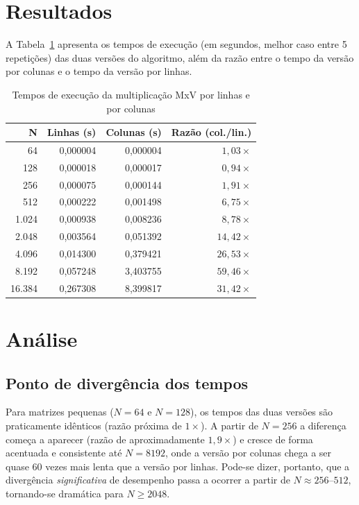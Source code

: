 \documentclass[a4paper,12pt]{article}
\begin{document}
\section{Resultados}

A Tabela~\ref{tab:resultados} apresenta os tempos de execução (em segundos,
melhor caso entre 5 repetições) das duas versões do algoritmo, além da razão
entre o tempo da versão por colunas e o tempo da versão por linhas.

\begin{table}[h]
\centering
\caption{Tempos de execução da multiplicação MxV por linhas e por colunas}
\label{tab:resultados}
\begin{tabular}{rrrr}
\toprule
N & Linhas (s) & Colunas (s) & Razão (col./lin.) \\
\midrule
64      & 0,000004 & 0,000004 & $1{,}03\times$  \\
128     & 0,000018 & 0,000017 & $0{,}94\times$  \\
256     & 0,000075 & 0,000144 & $1{,}91\times$  \\
512     & 0,000222 & 0,001498 & $6{,}75\times$  \\
1.024   & 0,000938 & 0,008236 & $8{,}78\times$  \\
2.048   & 0,003564 & 0,051392 & $14{,}42\times$ \\
4.096   & 0,014300 & 0,379421 & $26{,}53\times$ \\
8.192   & 0,057248 & 3,403755 & $59{,}46\times$ \\
16.384  & 0,267308 & 8,399817 & $31{,}42\times$ \\
\bottomrule
\end{tabular}
\end{table}

\section{Análise}

\subsection{Ponto de divergência dos tempos}

Para matrizes pequenas ($N = 64$ e $N = 128$), os tempos das duas versões são
praticamente idênticos (razão próxima de $1\times$). A partir de $N = 256$ a
diferença começa a aparecer (razão de aproximadamente $1{,}9\times$) e cresce de
forma acentuada e consistente até $N = 8192$, onde a versão por colunas chega a
ser quase 60 vezes mais lenta que a versão por linhas. Pode-se dizer, portanto,
que a divergência \emph{significativa} de desempenho passa a ocorrer a partir de
$N \approx 256$--$512$, tornando-se dramática para $N \geq 2048$.
\end{document}
